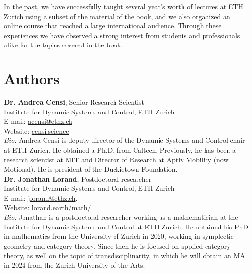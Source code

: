 \documentclass[10pt, article, one side]{memoir}
\begin{document}
    In the past, we have successfully taught several year's worth of lectures at ETH Zurich using a subset of the material of the book, and we also organized an online course that reached a large international audience.
    Through these experiences we have observed a strong interest from students and professionals alike for the topics covered in the book.


    \section{Authors}
    \noindent \textbf{Dr.
        Andrea Censi}, Senior Research Scientist\\
    Institute for Dynamic Systems and Control, ETH Zurich\\
    E-mail: \href{mailto:acensi@ethz.ch}{acensi@ethz.ch}\\
    Website: \href{https://censi.science}{censi.science}\\
    \emph{Bio:} Andrea Censi is deputy director of the Dynamic Systems and Control chair at ETH Zurich.
    He obtained a Ph.D.
    from Caltech.
    Previously, he has been a research scientist at MIT and Director of Research at Aptiv Mobility (now Motional).
    He is president of the Duckietown Foundation.
    \\

    \noindent \textbf{Dr.
        Jonathan Lorand}, Postdoctoral researcher\\
    Institute for Dynamic Systems and Control, ETH Zurich\\
    E-mail: \href{mailto:jlorand@ethz.ch}{jlorand@ethz.ch}.
    \\
    Website: \href{http://lorand.earth/math/}{lorand.earth/math/}\\
    \emph{Bio:}
    Jonathan is a postdoctoral researcher working as a mathematician at the Institute for Dynamic Systems and Control at ETH Zurich.
    He obtained his PhD in mathematics from the University of Zurich in 2020, working in symplectic geometry and category theory.
    Since then he is focused on applied category theory, as well on the topic of transdisciplinarity, in which he will obtain an MA in 2024 from the Zurich University of the Arts.
    \\
\end{document}
